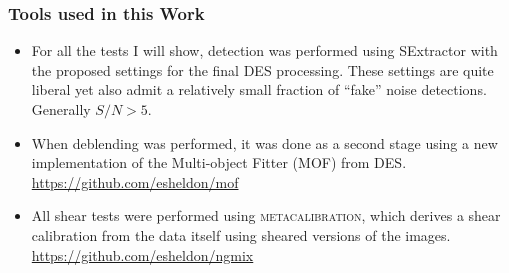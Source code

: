 \documentclass{beamer}
\newcommand{\mcal}{\textsc{metacalibration}}
\begin{document}
\frame
{
    \frametitle{Tools used in this Work}

 
    \begin{itemize}

        \item For all the tests I will show, detection was performed using SExtractor
            with the proposed settings for the final DES processing.  These settings
            are quite liberal yet also admit a relatively small fraction of ``fake''
            noise detections.  Generally $S/N > 5$.

        \item When deblending was performed, it was done as a second stage
            using a new implementation of the Multi-object Fitter (MOF) from
            DES. \url{https://github.com/esheldon/mof}

        \item All shear tests were performed using \mcal, which derives a shear
            calibration from the data itself using sheared versions of the images.
            \url{https://github.com/esheldon/ngmix}


    \end{itemize}

}
\end{document}

